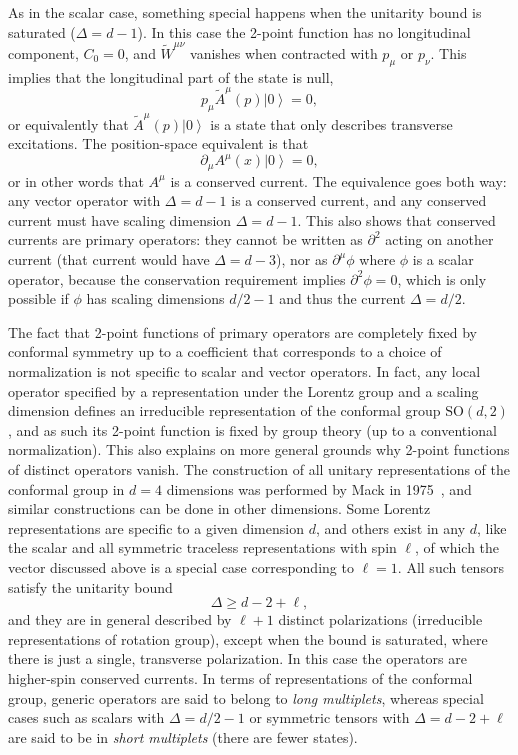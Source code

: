 \documentclass[a4paper,12pt]{article}
\newcommand{\ket}[1]{\left| #1 \right\rangle}
\numberwithin{equation}{section}
\begin{document}
As in the scalar case, something special happens when the unitarity bound is saturated ($\Delta = d - 1$). In this case the 2-point function has no longitudinal component, $C_0 = 0$,
and $\widetilde{W}^{\mu\nu}$ vanishes when contracted with $p_\mu$ or $p_\nu$. This implies that the longitudinal part of the state is null,
\begin{equation}
	p_\mu \widetilde{A}^\mu(p) \ket{0} = 0,
\end{equation}
or equivalently that $\widetilde{A}^\mu(p) \ket{0}$ is a state that only describes transverse excitations.
The position-space equivalent is that 
\begin{equation}
	\partial_\mu A^\mu(x) \ket{0} = 0,
\end{equation}
or in other words that $A^\mu$ is a conserved current.
The equivalence goes both way: any vector operator with $\Delta = d - 1$ is a conserved current, and any conserved current must have scaling dimension $\Delta = d - 1$. This also shows that conserved currents are  primary operators: they cannot be written as $\partial^2$ acting on another current (that current would have $\Delta = d - 3$), nor as $\partial^\mu \phi$ where $\phi$ is a scalar operator, because the conservation requirement implies $\partial^2 \phi = 0$, which is only possible if $\phi$ has scaling dimensions $d/2 - 1$ and thus the current $\Delta = d/2$.


The fact that 2-point functions of primary operators are completely fixed by conformal symmetry up to a coefficient that corresponds to a choice of normalization is not specific to scalar and vector operators. In fact, any local operator specified by a representation under the Lorentz group and a scaling dimension defines an irreducible representation of the conformal group $\text{SO}(d,2)$, and as such its 2-point function is fixed by group theory (up to a conventional normalization). This also explains on more general grounds why 2-point functions of distinct operators vanish.
The construction of all unitary representations of the conformal group in $d = 4$ dimensions was performed by Mack in 1975~\cite{Mack:1975je}, and similar constructions can be done in other dimensions. 
Some Lorentz representations are specific to a given dimension $d$, and others exist in any $d$, like the scalar and all symmetric traceless representations with spin $\ell$, of which the vector discussed above is a special case corresponding to $\ell = 1$. All such tensors satisfy the unitarity bound
\begin{equation}
	\Delta \geq d - 2 + \ell,
	\label{eq:unitaritybound:symmetricops}
\end{equation}
and they are in general described by $\ell + 1$ distinct polarizations (irreducible representations of rotation group), except when the bound is saturated, where there is just a single, transverse polarization. In this case the operators are higher-spin conserved currents.
In terms of representations of the conformal group, generic operators are said to belong to \emph{long multiplets}, whereas special cases such as scalars with $\Delta = d/2 - 1$ or symmetric tensors with $\Delta = d - 2 + \ell$ are said to be in \emph{short multiplets} (there are fewer states). 
\end{document}
